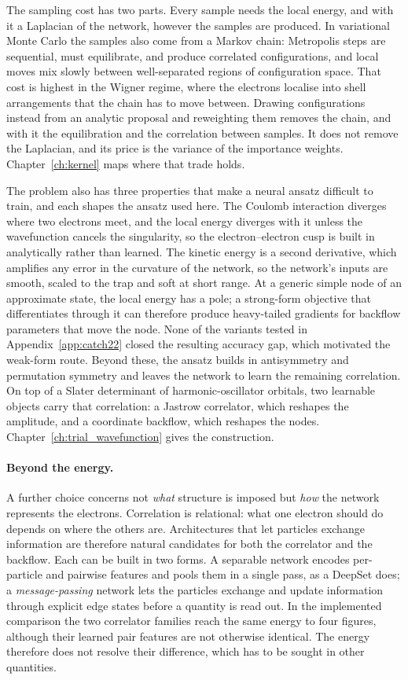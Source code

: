 The sampling cost has two parts. Every sample needs the local energy, and with it a
Laplacian of the network, however the samples are produced. In variational Monte Carlo the
samples also come from a Markov chain: Metropolis steps are sequential, must equilibrate,
and produce correlated configurations, and local moves mix slowly between well-separated
regions of configuration space. That cost is highest in the Wigner regime, where the
electrons localise into shell arrangements that the chain has to move between. Drawing
configurations instead from an analytic proposal and reweighting them removes the chain,
and with it the equilibration and the correlation between samples. It does not remove the
Laplacian, and its price is the variance of the importance weights.
Chapter~\ref{ch:kernel} maps where that trade holds.

The problem also has three properties that make a neural ansatz difficult to train, and each
shapes the ansatz used here. The Coulomb interaction diverges where two electrons meet, and
the local energy diverges with it unless the wavefunction cancels the singularity, so the
electron--electron cusp is built in analytically rather than learned. The kinetic energy is
a second derivative, which amplifies any error in the curvature of the network, so the
network's inputs are smooth, scaled to the trap and soft at short range. At a generic simple
node of an approximate state, the local energy has a pole; a strong-form objective that
differentiates through it can therefore produce heavy-tailed gradients for backflow
parameters that move the node. None of the variants tested in Appendix~\ref{app:catch22}
closed the resulting accuracy gap, which motivated the weak-form route. Beyond these,
the ansatz builds in antisymmetry and permutation symmetry and leaves the network to learn
the remaining correlation. On top of a Slater determinant of harmonic-oscillator orbitals,
two learnable objects carry that correlation: a Jastrow correlator, which reshapes the
amplitude, and a coordinate backflow, which reshapes the nodes.
Chapter~\ref{ch:trial_wavefunction} gives the construction.

\paragraph{Beyond the energy.}
A further choice concerns not \emph{what} structure is imposed but \emph{how} the network
represents the electrons. Correlation is relational: what one electron should do depends on
where the others are. Architectures that let particles exchange information are therefore
natural candidates for both the correlator and the backflow. Each can be built in two forms.
A separable network encodes per-particle and pairwise features and pools them in a single
pass, as a DeepSet does; a \emph{message-passing} network lets the particles exchange and
update information through explicit edge states before a quantity is read out. In the
implemented comparison the two correlator families reach the same energy to four figures,
although their learned pair features are not otherwise identical. The energy therefore does
not resolve their difference, which has to be sought in other quantities.

